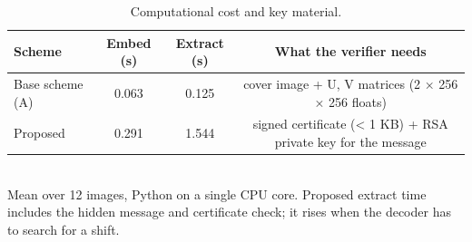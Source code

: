 \begin{table}[t]
\centering
\small
\caption{Computational cost and key material.}
\begin{tabular}{lccc}
\toprule
Scheme & Embed (s) & Extract (s) & What the verifier needs \\
\midrule
Base scheme (A) & 0.063 & 0.125 & cover image + U, V matrices (2 × 256 × 256 floats) \\
Proposed & 0.291 & 1.544 & signed certificate (< 1 KB) + RSA private key for the message \\
\bottomrule
\end{tabular}
\\[2pt]\footnotesize Mean over 12 images, Python on a single CPU core. Proposed extract time includes the hidden message and certificate check; it rises when the decoder has to search for a shift.
\end{table}
